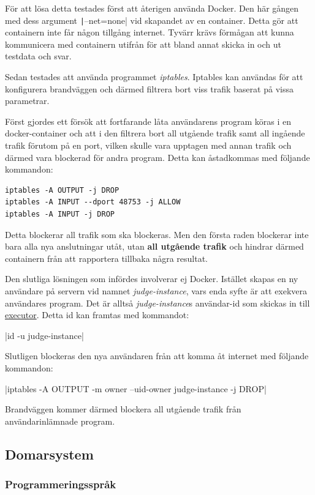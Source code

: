 \documentclass{article}
\begin{document}
För att lösa detta testades först att återigen använda Docker. Den här gången
med dess argument \texttt|--net=none| vid skapandet av
en container. Detta gör att containern inte får någon tillgång internet. Tyvärr
krävs förmågan att kunna kommunicera med containern utifrån för att bland annat
skicka in och ut testdata och svar.

Sedan testades att använda programmet \textit{iptables}. Iptables kan användas
för att konfigurera brandväggen och därmed filtrera bort viss trafik baserat på
vissa parametrar.

Först gjordes ett försök att fortfarande låta användarens program köras i en
docker-container och att i den filtrera bort all utgående trafik samt all
ingående trafik förutom på en port, vilken skulle vara upptagen med annan
trafik och därmed vara blockerad för andra program. Detta kan åstadkommas med
följande kommandon:

\begin{verbatim}
iptables -A OUTPUT -j DROP
iptables -A INPUT --dport 48753 -j ALLOW
iptables -A INPUT -j DROP
\end{verbatim}


Detta blockerar all trafik som ska blockeras. Men den första raden blockerar
inte bara alla nya anslutningar utåt, utan \textbf{all utgående trafik} och
hindrar därmed containern från att rapportera tillbaka några resultat.

Den slutliga lösningen som infördes involverar ej Docker. Istället skapas
en ny användare på servern vid namnet \textit{judge-instance}, vars enda
syfte är att exekvera användares program. Det är alltså \textit{judge-instance}s
användar-id som skickas in till \hyperlink{executor}{executor}.
Detta id kan framtas med kommandot:

|id -u judge-instance|

Slutligen blockeras den nya användaren från att komma åt internet med följande
kommandon:

|iptables -A OUTPUT -m owner --uid-owner judge-instance -j DROP|

Brandväggen kommer därmed blockera all utgående trafik från användarinlämnade
program.

\subsection{Domarsystem}

\subsubsection{Programmeringsspråk}
\end{document}
